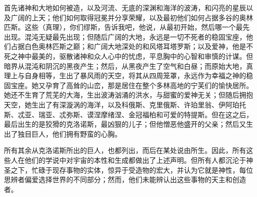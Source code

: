 首先诸神和大地如何被造，\newline{}以及河流、无底的深渊和海洋的波涛，\newline{}和闪亮的星辰以及广阔的上天；\newline{}他们如何取得冠冕并分享荣耀，\newline{}以及最初他们如何占据多谷的奥林匹斯。\newline{}这些（真理），你们缪斯，告诉我吧，他说，\newline{}从最初开始，然后哪一个最先出现。\newline{}混沌无疑最先出现；但随后\newline{}广阔的大地，永远是一切\newline{}不死者的稳固宝座，他们占据白色奥林匹斯之巅；\newline{}和广阔大地深处的和风塔耳塔罗斯；\newline{}以及爱神，他是不死之神中最美的，\newline{}驱散诸神和众人心中的忧虑，\newline{}平息胸中的心智和审慎的计谋。\newline{}但暗界从混沌和阴沉的黑夜产生；\newline{}然后，从黑夜产生了空气和白昼；\newline{}而原始大地，真理上与自身相等，生出了\newline{}暴风雨的天空，将其从四周笼罩，\newline{}永远作为幸福之神的稳固宝座。\newline{}她又孕育了高耸的山峦，那是\newline{}居住在整个多林高地的宁芙们的愉快居所。\newline{}她还不生育了荒芜的大海，生出波涛汹涌\newline{}的洪水，与甜蜜的爱神无关；但随后\newline{}拥抱天空，她生出了有深漩涡的海洋，\newline{}以及科俄斯、克里俄斯、许珀里翁、伊阿珀托斯、\newline{}忒亚、瑞亚、忒弥斯、谟涅摩绪涅、\newline{}金冠福柏和可爱的特提斯。\newline{}但在这之后，最后出生的是狡猾的克洛诺斯，\newline{}最凶狠的儿子；但他憎恶他盛开的父亲；\newline{}然后又生出了独目巨人，他们拥有野蛮的心胸。\par

所有其余从克洛诺斯所出的巨人，也都列出，而后在某处说由所生。因此，所有这些人在他们的学说中对宇宙的本性和生成都做出了上述声明。但所有人都沉沦于神圣之下，忙碌于现存事物的实体，惊异于受造物的宏大，并认为它就是神性，每位思辨者偏爱选择世界的不同部分；然而，他们未能辨认出这些事物的天主和创造者。\par

